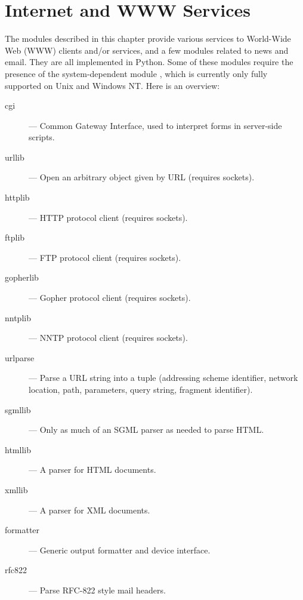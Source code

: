 \chapter{Internet and WWW Services}

The modules described in this chapter provide various services to
World-Wide Web (WWW) clients and/or services, and a few modules
related to news and email.  They are all implemented in Python.  Some
of these modules require the presence of the system-dependent module
, which is currently only fully supported on Unix and
Windows NT.  Here is an overview:

\begin{description}

\item[cgi]
--- Common Gateway Interface, used to interpret forms in server-side
scripts.

\item[urllib]
--- Open an arbitrary object given by URL (requires sockets).

\item[httplib]
--- HTTP protocol client (requires sockets).

\item[ftplib]
--- FTP protocol client (requires sockets).

\item[gopherlib]
--- Gopher protocol client (requires sockets).

\item[nntplib]
--- NNTP protocol client (requires sockets).

\item[urlparse]
--- Parse a URL string into a tuple (addressing scheme identifier, network
location, path, parameters, query string, fragment identifier).

\item[sgmllib]
--- Only as much of an SGML parser as needed to parse HTML.

\item[htmllib]
--- A parser for HTML documents.

\item[xmllib]
--- A parser for XML documents.

\item[formatter]
--- Generic output formatter and device interface.

\item[rfc822]
--- Parse RFC-822 style mail headers.


\end{description}
